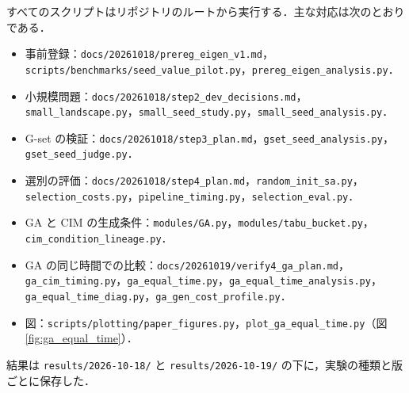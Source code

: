 すべてのスクリプトはリポジトリのルートから実行する．主な対応は次のとおりである．
\begin{itemize}\raggedright
  \item 事前登録：\texttt{docs/20261018/prereg\_eigen\_v1.md}，\texttt{scripts/benchmarks/seed\_value\_pilot.py}，\texttt{prereg\_eigen\_analysis.py}．
  \item 小規模問題：\texttt{docs/20261018/step2\_dev\_decisions.md}，\texttt{small\_landscape.py}，\texttt{small\_seed\_study.py}，\texttt{small\_seed\_analysis.py}．
  \item G-set の検証：\texttt{docs/20261018/step3\_plan.md}，\texttt{gset\_seed\_analysis.py}，\texttt{gset\_seed\_judge.py}．
  \item 選別の評価：\texttt{docs/20261018/step4\_plan.md}，\texttt{random\_init\_sa.py}，\texttt{selection\_costs.py}，\texttt{pipeline\_timing.py}，\texttt{selection\_eval.py}．
  \item GA と CIM の生成条件：\texttt{modules/GA.py}，\texttt{modules/tabu\_bucket.py}，\texttt{cim\_condition\_lineage.py}．
  \item GA の同じ時間での比較：\texttt{docs/20261019/verify4\_ga\_plan.md}，\texttt{ga\_cim\_timing.py}，\texttt{ga\_equal\_time.py}，\texttt{ga\_equal\_time\_analysis.py}，\texttt{ga\_equal\_time\_diag.py}，\texttt{ga\_gen\_cost\_profile.py}．
  \item 図：\texttt{scripts/plotting/paper\_figures.py}，\texttt{plot\_ga\_equal\_time.py}（図\ref{fig:ga_equal_time}）．
\end{itemize}
結果は \texttt{results/2026-10-18/} と \texttt{results/2026-10-19/} の下に，実験の種類と版ごとに保存した．
